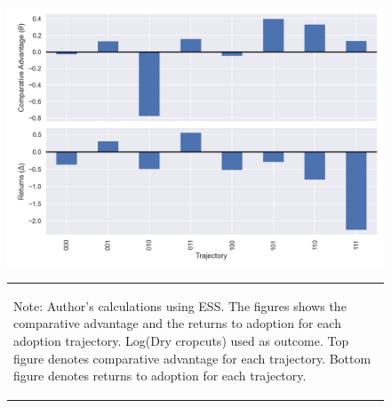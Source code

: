\documentclass[11pt]{article}
\begin{document}
\begin{figure}
    \centering
    \caption{Comparative Advantage and Returns by Trajectory (Dry Cropcuts)}
    \includegraphics[scale=0.7]{results/figures/theta.png}\label{fig:theta_delta_raw}
        \vspace*{-2em}
    \begin{table}[H]
        \centering
        \begin{tabular}{p{}} 
            \begin{tablenotes}
                  \small
                  \item Note: Author's calculations using ESS. The figures shows the comparative advantage and the returns to adoption for each adoption trajectory. Log(Dry cropcuts) used as outcome. Top figure denotes comparative advantage for each trajectory. Bottom figure denotes returns to adoption for each trajectory.
            \end{tablenotes}
        \end{tabular}
    \end{table}
\end{figure}

\end{document}
